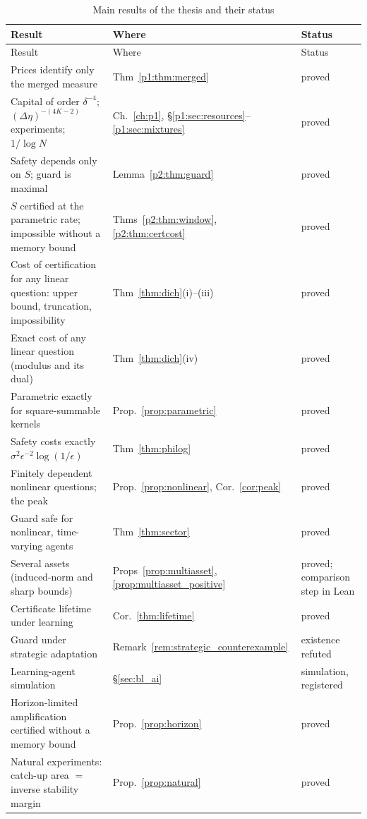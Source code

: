 {\footnotesize\begin{longtable}{p{}p{}p{}}
\caption{Main results of the thesis and their status}\label{tab:intro_status}\\
\toprule
Result & Where & Status\\
\midrule
\endfirsthead
\toprule
Result & Where & Status\\
\midrule
\endhead
Prices identify only the merged measure & Thm~\ref{p1:thm:merged} & proved\\
Capital of order $\delta^{-4}$; $(\Delta\eta)^{-(4K-2)}$ experiments; $1/\log N$ & Ch.~\ref{ch:p1}, \S\ref{p1:sec:resources}--\ref{p1:sec:mixtures} & proved\\
Safety depends only on $S$; guard is maximal & Lemma~\ref{p2:thm:guard} & proved\\
$S$ certified at the parametric rate; impossible without a memory bound & Thms~\ref{p2:thm:window}, \ref{p2:thm:certcost} & proved\\
Cost of certification for any linear question: upper bound, truncation, impossibility & Thm~\ref{thm:dich}(i)--(iii) & proved\\
Exact cost of any linear question (modulus and its dual) & Thm~\ref{thm:dich}(iv) & proved\\
Parametric exactly for square-summable kernels & Prop.~\ref{prop:parametric} & proved\\
Safety costs exactly $\sigma^2\epsilon^{-2}\log(1/\epsilon)$ & Thm~\ref{thm:philog} & proved\\
Finitely dependent nonlinear questions; the peak & Prop.~\ref{prop:nonlinear}, Cor.~\ref{cor:peak} & proved\\
Guard safe for nonlinear, time-varying agents & Thm~\ref{thm:sector} & proved\\
Several assets (induced-norm and sharp bounds) & Props~\ref{prop:multiasset}, \ref{prop:multiasset_positive} & proved; comparison step in Lean\\
Certificate lifetime under learning & Cor.~\ref{thm:lifetime} & proved\\
Guard under strategic adaptation & Remark~\ref{rem:strategic_counterexample} & existence refuted\\
Learning-agent simulation & \S\ref{sec:bl_ai} & simulation, registered\\
Horizon-limited amplification certified without a memory bound & Prop.~\ref{prop:horizon} & proved\\
Natural experiments: catch-up area $=$ inverse stability margin & Prop.~\ref{prop:natural} & proved\\

\end{longtable}}
